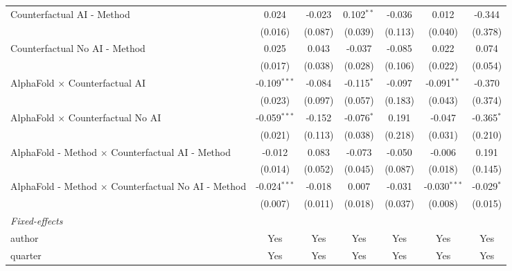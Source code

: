 \begin{tabular}{lcccccc}
   Counterfactual AI - Method                                 & 0.024          & -0.023       & 0.102$^{**}$  & -0.036  & 0.012          & -0.344\\   
                                                              & (0.016)        & (0.087)      & (0.039)       & (0.113) & (0.040)        & (0.378)\\   
   Counterfactual No AI - Method                              & 0.025          & 0.043        & -0.037        & -0.085  & 0.022          & 0.074\\   
                                                              & (0.017)        & (0.038)      & (0.028)       & (0.106) & (0.022)        & (0.054)\\   
   AlphaFold $\times$ Counterfactual AI                       & -0.109$^{***}$ & -0.084       & -0.115$^{*}$  & -0.097  & -0.091$^{**}$  & -0.370\\   
                                                              & (0.023)        & (0.097)      & (0.057)       & (0.183) & (0.043)        & (0.374)\\   
   AlphaFold $\times$ Counterfactual No AI                    & -0.059$^{***}$ & -0.152       & -0.076$^{*}$  & 0.191   & -0.047         & -0.365$^{*}$\\   
                                                              & (0.021)        & (0.113)      & (0.038)       & (0.218) & (0.031)        & (0.210)\\   
   AlphaFold - Method $\times$ Counterfactual AI - Method     & -0.012         & 0.083        & -0.073        & -0.050  & -0.006         & 0.191\\   
                                                              & (0.014)        & (0.052)      & (0.045)       & (0.087) & (0.018)        & (0.145)\\   
   AlphaFold - Method $\times$ Counterfactual No AI - Method  & -0.024$^{***}$ & -0.018       & 0.007         & -0.031  & -0.030$^{***}$ & -0.029$^{*}$\\   
                                                              & (0.007)        & (0.011)      & (0.018)       & (0.037) & (0.008)        & (0.015)\\   
   \midrule
   \emph{Fixed-effects}\\
   author                                                     & Yes            & Yes          & Yes           & Yes     & Yes            & Yes\\  
   quarter                                                    & Yes            & Yes          & Yes           & Yes     & Yes            & Yes\\  

\end{tabular}

